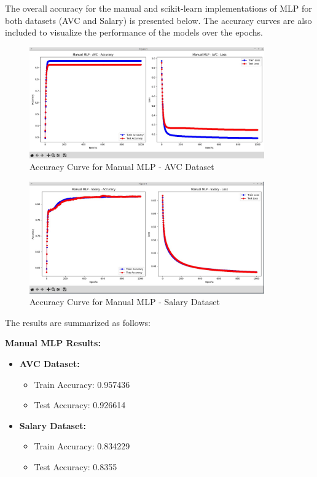 \documentclass[a4paper,12pt]{article}
\begin{document}
The overall accuracy for the manual and scikit-learn implementations of MLP for both datasets (AVC and Salary) is presented below. The accuracy curves are also included to visualize the performance of the models over the epochs.

\begin{figure}[H]
    \centering
    \includegraphics[width=0.9\textwidth]{Resources/mlp_curve_avc.jpeg}
    \caption{Accuracy Curve for Manual MLP - AVC Dataset}
    \label{fig:mlp_curve_avc}
\end{figure}

\begin{figure}[H]
    \centering
    \includegraphics[width=0.9\textwidth]{Resources/mlp_curve_salary.jpeg}
    \caption{Accuracy Curve for Manual MLP - Salary Dataset}
    \label{fig:mlp_curve_salary}
\end{figure}

The results are summarized as follows:

\textbf{Manual MLP Results:}
\begin{itemize}
    \item \textbf{AVC Dataset:}
        \begin{itemize}
            \item Train Accuracy: 0.957436
            \item Test Accuracy: 0.926614
        \end{itemize}
    \item \textbf{Salary Dataset:}
        \begin{itemize}
            \item Train Accuracy: 0.834229
            \item Test Accuracy: 0.8355
        \end{itemize}
\end{itemize}
\end{document}
